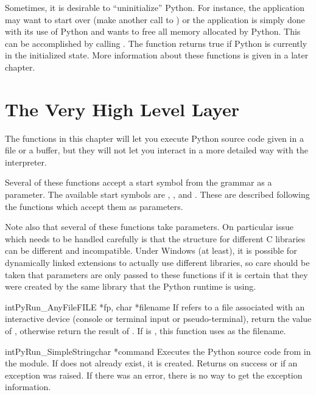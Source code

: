 \documentclass{manual}
\begin{document}
Sometimes, it is desirable to ``uninitialize'' Python.  For instance, 
the application may want to start over (make another call to 
) or the application is simply done with its 
use of Python and wants to free all memory allocated by Python.  This
can be accomplished by calling .  The function
 returns
true if Python is currently in the initialized state.  More
information about these functions is given in a later chapter.


\chapter{The Very High Level Layer \label{veryhigh}}

The functions in this chapter will let you execute Python source code
given in a file or a buffer, but they will not let you interact in a
more detailed way with the interpreter.

Several of these functions accept a start symbol from the grammar as a 
parameter.  The available start symbols are ,
, and .  These are
described following the functions which accept them as parameters.

Note also that several of these functions take 
parameters.  On particular issue which needs to be handled carefully
is that the  structure for different C libraries can be
different and incompatible.  Under Windows (at least), it is possible
for dynamically linked extensions to actually use different libraries,
so care should be taken that  parameters are only passed
to these functions if it is certain that they were created by the same
library that the Python runtime is using.

\begin{cfuncdesc}{int}{PyRun_AnyFile}{FILE *fp, char *filename}
  If  refers to a file associated with an interactive device
  (console or terminal input or \UNIX{} pseudo-terminal), return the
  value of , otherwise return the
  result of .  If  is
  \NULL{}, this function uses  as the filename.
\end{cfuncdesc}

\begin{cfuncdesc}{int}{PyRun_SimpleString}{char *command}
  Executes the Python source code from  in the
   module.  If  does not already
  exist, it is created.  Returns  on success or  if
  an exception was raised.  If there was an error, there is no way to
  get the exception information.
\end{cfuncdesc}
\end{document}
